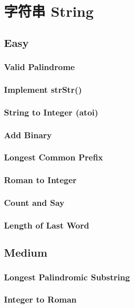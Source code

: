 \documentclass[12pt]{book}
\begin{document}
\chapter{字符串 String}
\label{sec-2}
\section{Easy}
\label{sec-2-1}
\subsection{Valid Palindrome}
\label{sec-2-1-1}
\subsection{Implement strStr()}
\label{sec-2-1-2}
\subsection{String to Integer (atoi)}
\label{sec-2-1-3}
\subsection{Add Binary}
\label{sec-2-1-4}
\subsection{Longest Common Prefix}
\label{sec-2-1-5}
\subsection{Roman to Integer}
\label{sec-2-1-6}
\subsection{Count and Say}
\label{sec-2-1-7}
\subsection{Length of Last Word}
\label{sec-2-1-8}
\section{Medium}
\label{sec-2-2}
\subsection{Longest Palindromic Substring}
\label{sec-2-2-1}
\subsection{Integer to Roman}
\label{sec-2-2-2}
\end{document}

